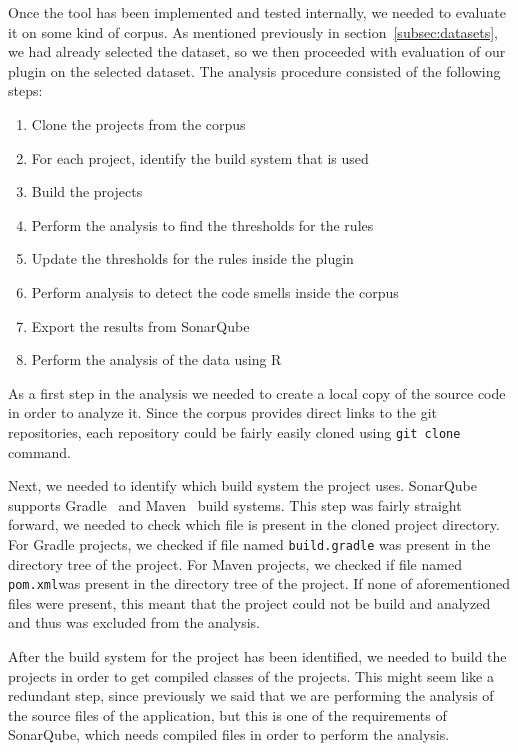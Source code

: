 
Once the tool has been implemented and tested internally, we needed to evaluate it on some kind of corpus.
As mentioned previously in section~\ref{subsec:datasets}, we had already selected the dataset, so we then proceeded with
evaluation of our plugin on the selected dataset.
The analysis procedure consisted of the following steps:
\begin{enumerate}
    \item Clone the projects from the corpus
    \item For each project, identify the build system that is used
    \item Build the projects
    \item Perform the analysis to find the thresholds for the rules
    \item Update the thresholds for the rules inside the plugin
    \item Perform analysis to detect the code smells inside the corpus
    \item Export the results from SonarQube
    \item Perform the analysis of the data using R
\end{enumerate}

As a first step in the analysis we needed to create a local copy of the source code in order to analyze it.
Since the corpus provides direct links to the git repositories, each repository could be fairly easily cloned
using \verb|git clone| command.

Next, we needed to identify which build system the project uses.
SonarQube supports Gradle~\cite{gradle} and Maven~\cite{maven} build systems.
This step was fairly straight forward, we needed to check which file is present in the cloned project
directory.
For Gradle projects, we checked if file named \verb|build.gradle| was present in the directory tree of the project.
For Maven projects, we checked if file named \verb|pom.xml|was present in the directory tree of the project.
If none of aforementioned files were present, this meant that the project could not be build and analyzed and thus
was excluded from the analysis.

After the build system for the project has been identified, we needed to build the projects in order
to get compiled classes of the projects.
This might seem like a redundant step, since previously we said that we are performing the analysis of the source
files of the application, but this is one of the requirements of SonarQube, which needs compiled files in order to
perform the analysis.

